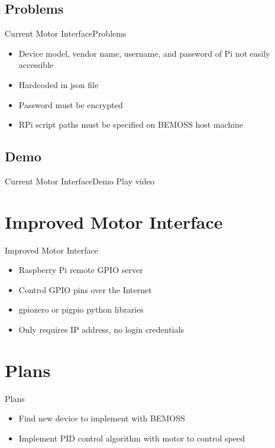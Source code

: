 \documentclass{beamer}
\begin{document}
\subsection{Problems}

\begin{frame}{Current Motor Interface}{Problems}
	\begin{itemize}
		\item Device model, vendor name, username, and password of Pi not easily accessible
		\item Hardcoded in json file
		\item Password must be encrypted 
		\item RPi script paths must be specified on BEMOSS host machine
	\end{itemize}
\end{frame}

\subsection{Demo}

\begin{frame}{Current Motor Interface}{Demo}
\center
Play video
\end{frame}

\section{Improved Motor Interface}

\begin{frame}{Improved Motor Interface}{}
	\begin{itemize}
		\item Raspberry Pi remote GPIO server
		\item Control GPIO pins over the Internet
		\item gpiozero or pigpio python libraries
		\item Only requires IP address, no login credentials
	\end{itemize}
\end{frame}

\section{Plans}

\begin{frame}{Plans}{}
	\begin{itemize}
		\item Find new device to implement with BEMOSS
		\item Implement PID control algorithm with motor to control speed
	\end{itemize}
\end{frame}
\end{document}
